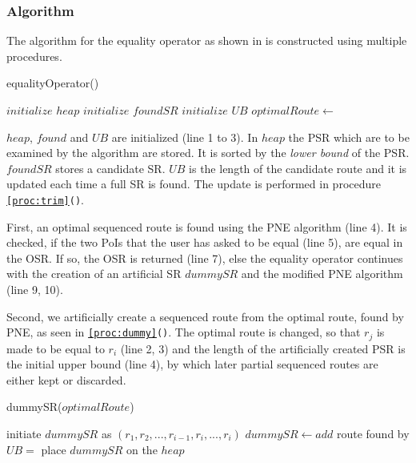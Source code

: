 \subsubsection{Algorithm}

The algorithm for the equality operator as shown in \texttt{} is constructed using multiple procedures.

\begin{algorithm}[htb!]
\caption{equalityOperator()}
\label{alg:equality}
	
	
	\BlankLine
	
	$initialize$ $heap$ 
	$initialize$ $foundSR$ 
	$initialize$ $UB$\; 
	$optimalRoute \leftarrow$\;
	{
		\dummySR{}\;
		\modifiedPNE{}\;
	}

\end{algorithm}

\pagebreak

$heap$, $found$ and $UB$ are initialized (line 1 to 3). In $heap$ the PSR which are to be examined by the algorithm are stored. It is sorted by the \textit{lower bound} of the PSR. $foundSR$ stores a candidate SR. $UB$ is the length of the candidate route and it is updated each time a full SR is found. The update is performed in procedure \texttt{\ref{proc:trim}()}.

First, an optimal sequenced route is found using the PNE algorithm (line 4). It is checked, if the two PoIs that the user has asked to be equal (line 5), are equal in the OSR. If so, the OSR is returned (line 7), else the equality operator continues with the creation of an artificial SR $dummySR$ and the modified PNE algorithm (line 9, 10). 

Second, we artificially create a sequenced route from the optimal route, found by PNE, as seen in \texttt{\ref{proc:dummy}()}. The optimal route is changed, so that $r_j$ is made to be equal to $r_i$ (line 2, 3) and the length of the artificially created PSR is the initial upper bound (line 4), by which later partial sequenced routes are either kept or discarded.

\begin{procedure}[htb!]
\caption{dummySR($optimalRoute$)}
\label{proc:dummy}
	
	initiate $dummySR$ as $(r_1, r_2, ..., r_{i-1}, r_i, ..., r_i)$ 
	$dummySR \leftarrow add$ route found by \;
	$UB =$ \;
	place $dummySR$ on the $heap$\;
\end{procedure}

